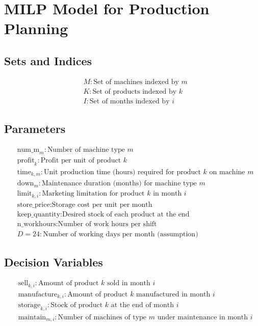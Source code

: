 \documentclass{article}
\begin{document}
\section*{MILP Model for Production Planning}

\subsection*{Sets and Indices}
\begin{align*}
    & M: \text{Set of machines indexed by } m \\
    & K: \text{Set of products indexed by } k \\
    & I: \text{Set of months indexed by } i
\end{align*}

\subsection*{Parameters}
\begin{align*}
    & \text{num\_m}_m: \text{Number of machine type } m \\
    & \text{profit}_k: \text{Profit per unit of product } k \\
    & \text{time}_{k, m}: \text{Unit production time (hours) required for product } k \text{ on machine } m \\
    & \text{down}_m: \text{Maintenance duration (months) for machine type } m \\
    & \text{limit}_{k, i}: \text{Marketing limitation for product } k \text{ in month } i \\
    & \text{store\_price}: \text{Storage cost per unit per month} \\
    & \text{keep\_quantity}: \text{Desired stock of each product at the end} \\
    & \text{n\_workhours}: \text{Number of work hours per shift} \\
    & D = 24: \text{Number of working days per month (assumption)}
\end{align*}

\subsection*{Decision Variables}
\begin{align*}
    & \text{sell}_{k, i}: \text{Amount of product } k \text{ sold in month } i \\
    & \text{manufacture}_{k, i}: \text{Amount of product } k \text{ manufactured in month } i \\
    & \text{storage}_{k, i}: \text{Stock of product } k \text{ at the end of month } i \\
    & \text{maintain}_{m, i}: \text{Number of machines of type } m \text{ under maintenance in month } i
\end{align*}
\end{document}
